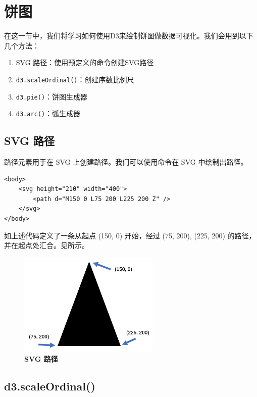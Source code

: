 \section{饼图}

在这一节中，我们将学习如何使用D3来绘制饼图做数据可视化。我们会用到以下几个方法：

\begin{enumerate}
    \item SVG 路径：使用预定义的命令创建SVG路径
    \item \verb|d3.scaleOrdinal()|：创建序数比例尺
    \item \verb|d3.pie()|：饼图生成器
    \item \verb|d3.arc()|：弧生成器
\end{enumerate}

\subsection{SVG 路径}

路径元素用于在 SVG 上创建路径。我们可以使用命令在 SVG 中绘制出路径。 

\begin{verbatim}
<body>
    <svg height="210" width="400">
        <path d="M150 0 L75 200 L225 200 Z" />
    </svg>
</body>
\end{verbatim}

如上述代码定义了一条从起点 (150, 0) 开始，经过 (75, 200), (225, 200) 的路径，并在起点处汇合。见所示。

\begin{figure}[htbp]
    \centering
    \includegraphics[width=0.6\textwidth]{figure/D3/svg_path.png}
    \caption{\textbf{SVG 路径}}
    \label{fig:svg_path}
\end{figure}

\subsection{d3.scaleOrdinal()}

